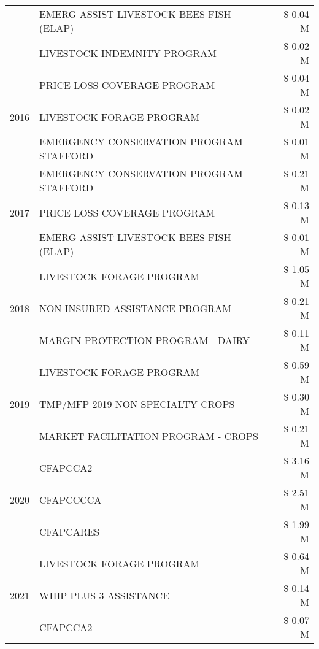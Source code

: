 \begin{tabular}{llr}
 & EMERG ASSIST LIVESTOCK BEES FISH (ELAP) & \$ 0.04 M \\
 & LIVESTOCK INDEMNITY PROGRAM & \$ 0.02 M \\
\cline{1-3}
\multirow[t]{3}{*}{2016} & PRICE LOSS COVERAGE PROGRAM & \$ 0.04 M \\
 & LIVESTOCK FORAGE PROGRAM & \$ 0.02 M \\
 & EMERGENCY CONSERVATION PROGRAM STAFFORD & \$ 0.01 M \\
\cline{1-3}
\multirow[t]{3}{*}{2017} & EMERGENCY CONSERVATION PROGRAM STAFFORD & \$ 0.21 M \\
 & PRICE LOSS COVERAGE PROGRAM & \$ 0.13 M \\
 & EMERG ASSIST LIVESTOCK BEES FISH (ELAP) & \$ 0.01 M \\
\cline{1-3}
\multirow[t]{3}{*}{2018} & LIVESTOCK FORAGE PROGRAM & \$ 1.05 M \\
 & NON-INSURED ASSISTANCE PROGRAM & \$ 0.21 M \\
 & MARGIN PROTECTION PROGRAM - DAIRY & \$ 0.11 M \\
\cline{1-3}
\multirow[t]{3}{*}{2019} & LIVESTOCK FORAGE PROGRAM & \$ 0.59 M \\
 & TMP/MFP 2019 NON SPECIALTY CROPS & \$ 0.30 M \\
 & MARKET FACILITATION PROGRAM - CROPS & \$ 0.21 M \\
\cline{1-3}
\multirow[t]{3}{*}{2020} & CFAPCCA2 & \$ 3.16 M \\
 & CFAPCCCCA & \$ 2.51 M \\
 & CFAPCARES & \$ 1.99 M \\
\cline{1-3}
\multirow[t]{3}{*}{2021} & LIVESTOCK FORAGE PROGRAM & \$ 0.64 M \\
 & WHIP PLUS 3 ASSISTANCE & \$ 0.14 M \\
 & CFAPCCA2 & \$ 0.07 M \\
\cline{1-3}
\bottomrule
\end{tabular}
